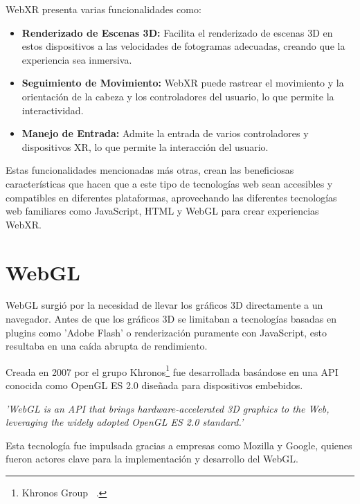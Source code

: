 \documentclass[a4paper, 12pt]{book}
\let\cleardoublepage\clearpage
\begin{document}
WebXR presenta varias funcionalidades como: 

\begin{itemize}
  
 \item \textbf{Renderizado de Escenas 3D:} Facilita el renderizado de escenas 3D en estos dispositivos a las velocidades de fotogramas adecuadas, creando que la experiencia sea inmersiva.
 
 \item \textbf{Seguimiento de Movimiento:} WebXR puede rastrear el movimiento y la orientación de la cabeza y los controladores del usuario, lo que permite la interactividad.
 
 \item \textbf{Manejo de Entrada:} Admite la entrada de varios controladores y dispositivos XR, lo que permite la interacción del usuario.

\end{itemize}
Estas funcionalidades mencionadas más otras, crean las beneficiosas características que hacen que a este tipo de tecnologías web sean accesibles y compatibles en diferentes plataformas, aprovechando las diferentes tecnologías web familiares como JavaScript, HTML y WebGL para crear experiencias WebXR.

\cleardoublepage
\section{WebGL} 
\label{sec:seccion5}

WebGL surgió por la necesidad de llevar los gráficos 3D directamente a un navegador. Antes de que los gráficos 3D se limitaban a tecnologías basadas en plugins como 'Adobe Flash' o renderización puramente con JavaScript, esto resultaba en una caída abrupta de rendimiento.

Creada en 2007 por el grupo Khronos\footnote{Khronos Group ~\cite{webgl-khronos}.} fue desarrollada basándose en una API conocida como OpenGL ES 2.0 diseñada para dispositivos embebidos.

\textit{'WebGL is an API that brings hardware-accelerated 3D graphics to the Web, leveraging the widely adopted OpenGL ES 2.0 standard.' \cite{webgl-khronos}}

Esta tecnología fue impulsada gracias a empresas como Mozilla y Google, quienes fueron actores clave para la implementación y desarrollo del WebGL.
\end{document}

